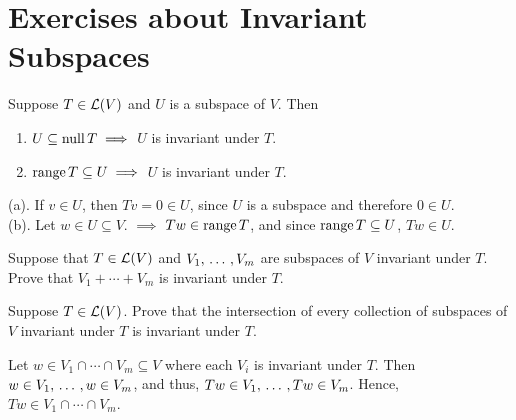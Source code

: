 \section*{Exercises about Invariant Subspaces}

\begin{xrcs}
  Suppose $T \in \mathcal{L}(V)$ and $U$ is a subspace of $V$. Then
  \begin{enumerate}
    \item $U \subseteq \operatorname{null} T \implies$ $U$ is invariant under $T$.
    \item $\operatorname{range} T \subseteq U \implies$ $U$ is invariant under $T$.
  \end{enumerate}

  \begin{xprf}
    { }(a). { }If $v \in U$, then $Tv = 0 \in U$, since $U$ is a subspace and therefore $0 \in U$. \\
    (b). { }Let $w \in U\subseteq V$. $\implies$ $Tw \in \operatorname{range} T$, and since $\operatorname{range} T \subseteq U$, $Tw \in U$.
  \end{xprf}

\end{xrcs}

\begin{xrcs}
  Suppose that $T \in \mathcal{L} (V)$ and $V_1, {\, \ldots \,\,}, V_m$ are subspaces of $V$ invariant under $T$.
  Prove that $V_1 + \cdots + V_m$ is invariant under $T$.

\end{xrcs}

\begin{xrcs}
  Suppose $T \in \mathcal{L}(V)$. Prove that the intersection of every collection of subspaces of $V$ invariant under $T$ is invariant under $T$.

  \begin{xprf}
    Let $w \in V_1 \cap \cdots \cap V_m \subseteq V$ where each $V_i$ is invariant under $T$. Then $w \in V_1, {\, \ldots \,\,}, w \in V_m$, and thus, $Tw \in V_1, {\, \ldots \,\,}, Tw \in V_m$. Hence, $Tw \in V_1 \cap \cdots \cap V_m$.
  \end{xprf}
\end{xrcs}

